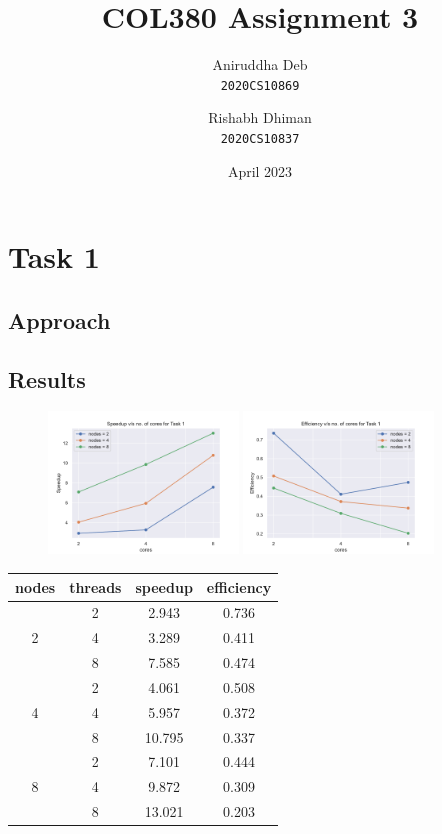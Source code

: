 \documentclass[12pt]{article}
\title{\textbf{COL380 Assignment 3}}
\author{%
    \begin{tabular}{c}Aniruddha Deb \\ \texttt{2020CS10869}\end{tabular} \and%
    \begin{tabular}{c}Rishabh Dhiman \\ \texttt{2020CS10837}\end{tabular} %
}
\date{April 2023}
\begin{document}
\maketitle

\section*{Task 1}

\subsection*{Approach}

\subsection*{Results}

\begin{figure}[!htbp]
    \centering
    \includegraphics[width=0.45\textwidth]{speedup_t1.pdf}
    \includegraphics[width=0.45\textwidth]{efficiency_t1.pdf}
\end{figure}

\begin{table}[!htbp]
    \centering
\begin{tabular}{|c|c|c|c|}
    \hline
    nodes & threads & speedup & efficiency \\

    \hline
    \multirow{3}{*}{2}
    & 2 & 2.943 & 0.736 \\
    & 4 & 3.289 & 0.411 \\
    & 8 & 7.585 & 0.474 \\

    \hline
    \multirow{3}{*}{4}
    & 2 & 4.061 & 0.508 \\
    & 4 & 5.957 & 0.372 \\
    & 8 & 10.795 & 0.337 \\

    \hline
    \multirow{3}{*}{8}
    & 2 & 7.101 & 0.444 \\
    & 4 & 9.872 & 0.309 \\
    & 8 & 13.021 & 0.203 \\
    \hline
\end{tabular}
\end{table}
\end{document}

